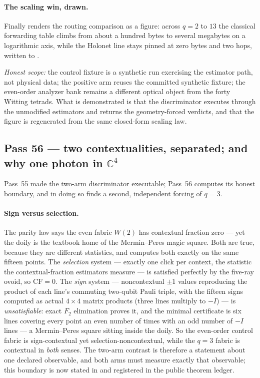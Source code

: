 \documentclass[11pt]{article}
\begin{document}
\paragraph{The scaling win, drawn.}  Finally
 renders the routing comparison as a
figure: across \(q=2\) to \(13\) the classical forwarding table climbs from about
a hundred bytes to several megabytes on a logarithmic axis, while the Holonet line
stays pinned at zero bytes and two hops, written to .

\emph{Honest scope:} the control fixture is a synthetic run exercising the
estimator path, not physical data; the positive arm reuses the committed synthetic
fixture; the even-order analyzer bank remains a different optical object from the
forty Witting tetrads.  What is demonstrated is that the discriminator executes
through the unmodified estimators and returns the geometry-forced verdicts, and
that the figure is regenerated from the same closed-form scaling law.

\subsection{Pass 56 --- two contextualities, separated; and why one photon in \(\mathbb C^4\)}
\label{sec:capstone-fiftysix}

Pass~55 made the two-arm discriminator executable; Pass~56 computes its honest
boundary, and in doing so finds a second, independent forcing of \(q=3\).

\paragraph{Sign versus selection.}  The parity law says the even fabric \(W(2)\)
has contextual fraction zero --- yet the doily is the textbook home of the
Mermin--Peres magic square.  Both are true, because they are different
statistics, and  computes both exactly on the
same fifteen points.  The \emph{selection} system --- exactly one click per
context, the statistic the contextual-fraction estimators measure --- is
satisfied perfectly by the five-ray ovoid, so \(\mathrm{CF}=0\).  The
\emph{sign} system --- noncontextual \(\pm1\) values reproducing the product of
each line's commuting two-qubit Pauli triple, with the fifteen signs computed as
actual \(4\times4\) matrix products (three lines multiply to \(-I\)) --- is
\emph{unsatisfiable}: exact \(F_2\) elimination proves it, and the minimal
certificate is six lines covering every point an even number of times with an
odd number of \(-I\) lines --- a Mermin--Peres square sitting inside the doily.
So the even-order control fabric is sign-contextual yet selection-noncontextual,
while the \(q=3\) fabric is contextual in \emph{both} senses.  The two-arm
contrast is therefore a statement about one declared observable, and both arms
must measure exactly that observable; this boundary is now stated in
 and registered in the public theorem ledger.
\end{document}
